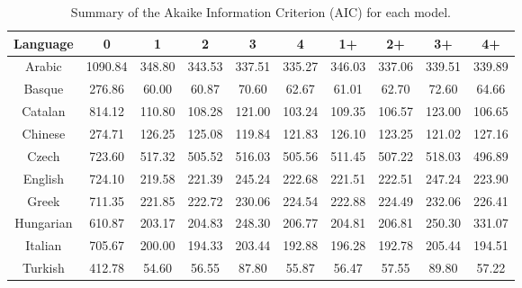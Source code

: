 \documentclass{article}
\begin{document}
\begin{table}[H]
\centering
\begin{tabular}{cccccccccc}
    Language & 0 & 1 & 2 & 3 & 4 & 1+ & 2+ & 3+ & 4+ \\
    \hline
    Arabic      & 1090.84 & 348.80  & 343.53    & 337.51  & 335.27  & 346.03    & 337.06 & 339.51  & 339.89    \\
    Basque      & 276.86  & 60.00   & 60.87     &  70.60  & 62.67   & 61.01     & 62.70  & 72.60   & 64.66   \\
    Catalan     & 814.12  & 110.80  & 108.28    & 121.00  & 103.24  & 109.35    & 106.57 & 123.00  &  106.65   \\
    Chinese     & 274.71  & 126.25  & 125.08    & 119.84  & 121.83  & 126.10    & 123.25 & 121.02  & 127.16    \\
    Czech       & 723.60  & 517.32  & 505.52    & 516.03  & 505.56  & 511.45    & 507.22 & 518.03  & 496.89    \\
    English     & 724.10  & 219.58  & 221.39    & 245.24  & 222.68  & 221.51    & 222.51 & 247.24  & 223.90   \\
    Greek       & 711.35  & 221.85  & 222.72    & 230.06  & 224.54  & 222.88    & 224.49 & 232.06  &  226.41   \\
    Hungarian   & 610.87  & 203.17  & 204.83    & 248.30  & 206.77  & 204.81    & 206.81 & 250.30  &  331.07 \\
    Italian     & 705.67  & 200.00  & 194.33    & 203.44  & 192.88  & 196.28    & 192.78 & 205.44  &  194.51   \\
    Turkish     & 412.78  & 54.60   & 56.55     & 87.80   & 55.87   & 56.47     & 57.55  & 89.80   &  57.22   \\
    \hline
\end{tabular}
\label{Table:T3}
\caption{Summary of the Akaike Information Criterion (AIC) for each model.}
\end{table}
\end{document}
